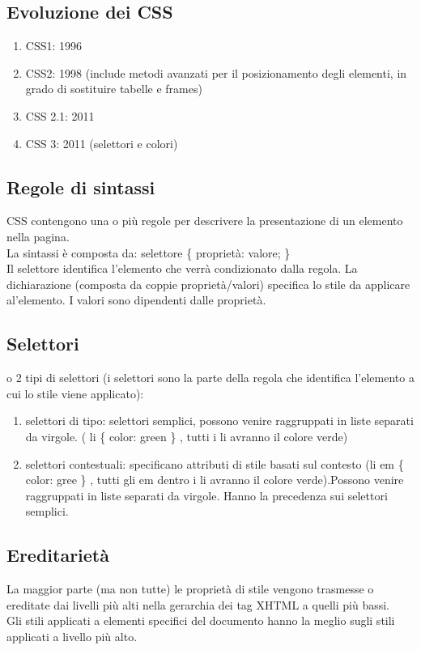 \documentclass{article}
\begin{document}
\subsection{Evoluzione dei CSS}
\begin{enumerate}
	\item CSS1: 1996
	\item CSS2: 1998 (include metodi avanzati per il posizionamento degli elementi, in grado di sostituire tabelle e frames)
	\item CSS 2.1: 2011
	\item CSS 3: 2011 (selettori e colori)
\end{enumerate}
\subsection{Regole di sintassi}
CSS contengono una o più regole per descrivere la presentazione di un elemento nella pagina.\\
La sintassi è composta da: selettore \{ proprietà: valore; \} \\
Il selettore identifica l'elemento che verrà condizionato dalla  regola. La dichiarazione (composta da coppie proprietà/valori) specifica lo stile da applicare al'elemento. I valori sono dipendenti dalle proprietà.\\
\subsection{Selettori}
o 2 tipi di selettori (i selettori sono la parte della regola che identifica l'elemento a cui lo stile viene applicato):
\begin{enumerate}
	\item selettori di tipo: selettori semplici, possono venire raggruppati in liste separati da virgole. ( li \{ color: green \} , tutti i li avranno il colore verde)
	\item selettori contestuali: specificano attributi di stile basati sul contesto (li em \{ color: gree \} , tutti gli em dentro i li avranno il colore verde).Possono venire raggruppati in liste separati da virgole. Hanno la precedenza sui selettori semplici.
\end{enumerate}
\subsection{Ereditarietà}
La maggior parte (ma non tutte) le proprietà di stile vengono trasmesse o ereditate dai livelli più alti nella gerarchia dei tag XHTML a quelli più bassi.\\
Gli stili applicati a elementi specifici del documento hanno la meglio sugli stili applicati a livello più alto.
\end{document}
